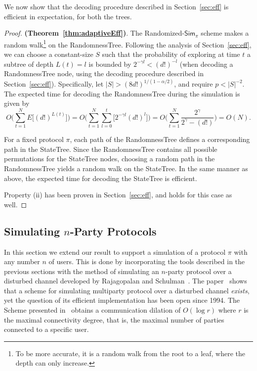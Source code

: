 \documentclass[ letterpaper, 11pt]{article}
\newcommand{\statetree}{{\textsf{StateTree}}\xspace}
\newcommand{\randomtree}{{\textsf{RandomnessTree}}\xspace}
\newcommand{\Sim}{{\mathsf{Sim}_\pi}}
\begin{document}
We now show that the decoding procedure described in Section~\ref{sec:eff} is efficient in expectation, for both the trees.
\begin{proof} \textbf{(Theorem~\ref{thm:adaptiveEff})}.
The Randomized-$\Sim$ scheme makes a random walk\footnote{
    To be more accurate,
    it is a random walk from the root to a leaf, where the depth can only increase.}
on the \randomtree.
Following the analysis of Section~\ref{sec:eff},
we can choose a constant-size $S$ such that
the probability of exploring at time $t$ a subtree of depth $L(t)=l$
is bounded by $2^{-\gamma l} < (d!)^{-l}$
(when decoding a \randomtree node,
using the decoding procedure described in Section~\ref{sec:eff}).
Specifically, let
$|S| > (8d!)^{1/(1-\alpha/2)}$,
and require $p<|S|^{-2}$.
The expected time for decoding
the \randomtree during the simulation is given by
\[
O\bigg(  \sum_{t=1}^N E \Big[ (d!)^{L(t)}\Big]\bigg) =
O\bigg(  \sum_{t=1}^N\sum_{l=0}^t \Big[ 2^{-\gamma l}(d!)^{l}\Big]\bigg) =
O\bigg(  \sum_{t=1}^N \frac{2^\gamma}{2^{\gamma} -(d!)} \bigg) = O(N)\text{.}
\]

For a fixed protocol $\pi$, each path of the \randomtree
defines a corresponding path in the \statetree. Since the \randomtree contains all
possible permutations
for the \statetree nodes, choosing a random path in the \randomtree yields a random walk on the
\statetree. In the same manner as above,
the expected time for decoding the \statetree is efficient.

Property (ii) has been proven in Section~\ref{sec:eff}, and holds for this case as well.
\end{proof}





\subsection{Simulating $n$-Party Protocols}\label{sec:multiparty}


In this section we extend our result to support a simulation
of a protocol $\pi$ with any number $n$ of users.
This is done by incorporating the tools described in the previous sections
with the method of simulating an $n$-party protocol over a disturbed channel
developed by Rajagopalan and Schulman~\cite{RS94}.
The paper~\cite{RS94} shows that a scheme for simulating multiparty protocol
over a disturbed channel
{\em exists},
yet the question of its efficient implementation has been open since 1994.
The Scheme presented in~\cite{RS94}
obtains a communication dilation of $O(\log r)$ where $r$ is the maximal connectivity degree,
that is, the maximal number of parties connected to a specific user.
\end{document}
